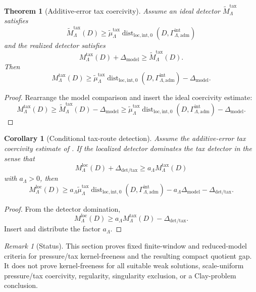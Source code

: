 \documentclass[11pt]{article}
\numberwithin{equation}{section}
\newtheorem{theorem}{Theorem}[section]
\newtheorem{corollary}[corollary]{Corollary}
\theoremstyle{definition}
\theoremstyle{remark}
\newtheorem{remark}[remark]{Remark}
\newcommand{\loc}{\mathrm{loc}}
\newcommand{\adm}{\mathrm{adm}}
\newcommand{\Dist}{\operatorname{dist}}
\begin{document}
\begin{theorem}[Additive-error tax coercivity]
\label{thm:additive-tax-coercivity}
Assume an ideal detector \(\widetilde M_{\Lambda}^{\mathrm{tax}}\) satisfies
\[
    \widetilde M_{\Lambda}^{\mathrm{tax}}(D)
    \ge
    \widetilde\mu_{\Lambda}^{\mathrm{tax}}
    \Dist_{\loc,\mathrm{int},0}
    (D,\Gamma_{\Lambda,\adm}^{\mathrm{int}})
\]
and the realized detector satisfies
\[
    M_{\Lambda}^{\mathrm{tax}}(D)
    +
    \Delta_{\mathrm{model}}
    \ge
    \widetilde M_{\Lambda}^{\mathrm{tax}}(D).
\]
Then
\[
    M_{\Lambda}^{\mathrm{tax}}(D)
    \ge
    \widetilde\mu_{\Lambda}^{\mathrm{tax}}
    \Dist_{\loc,\mathrm{int},0}
    (D,\Gamma_{\Lambda,\adm}^{\mathrm{int}})
    -
    \Delta_{\mathrm{model}}.
\]
\end{theorem}

\begin{proof}
Rearrange the model comparison and insert the ideal coercivity estimate:
\[
    M_{\Lambda}^{\mathrm{tax}}(D)
    \ge
    \widetilde M_{\Lambda}^{\mathrm{tax}}(D)
    -
    \Delta_{\mathrm{model}}
    \ge
    \widetilde\mu_{\Lambda}^{\mathrm{tax}}
    \Dist_{\loc,\mathrm{int},0}
    (D,\Gamma_{\Lambda,\adm}^{\mathrm{int}})
    -
    \Delta_{\mathrm{model}}.
\]
\end{proof}

\begin{corollary}[Conditional tax-route detection]
\label{cor:tax-route-transfer}
Assume the additive-error tax coercivity estimate of
.  If the localized detector dominates the tax
detector in the sense that
\[
    M_{\Lambda}^{\loc}(D)
    +
    \Delta_{\mathrm{det/tax}}
    \ge
    a_{\Lambda}M_{\Lambda}^{\mathrm{tax}}(D)
\]
with \(a_{\Lambda}>0\), then
\[
    M_{\Lambda}^{\loc}(D)
    \ge
    a_{\Lambda}\widetilde\mu_{\Lambda}^{\mathrm{tax}}
    \Dist_{\loc,\mathrm{int},0}
    (D,\Gamma_{\Lambda,\adm}^{\mathrm{int}})
    -
    a_{\Lambda}\Delta_{\mathrm{model}}
    -
    \Delta_{\mathrm{det/tax}}.
\]
\end{corollary}

\begin{proof}
From the detector domination,
\[
    M_{\Lambda}^{\loc}(D)
    \ge
    a_{\Lambda}M_{\Lambda}^{\mathrm{tax}}(D)
    -
    \Delta_{\mathrm{det/tax}}.
\]
Insert  and distribute the factor
\(a_{\Lambda}\).
\end{proof}

\begin{remark}[Status]
\label{rem:tax-kernel-status}
This section proves fixed finite-window and reduced-model criteria for
pressure/tax kernel-freeness and the resulting compact quotient gap.  It does
not prove kernel-freeness for all suitable weak solutions, scale-uniform
pressure/tax coercivity, regularity, singularity exclusion, or a Clay-problem
conclusion.
\end{remark}
\end{document}
